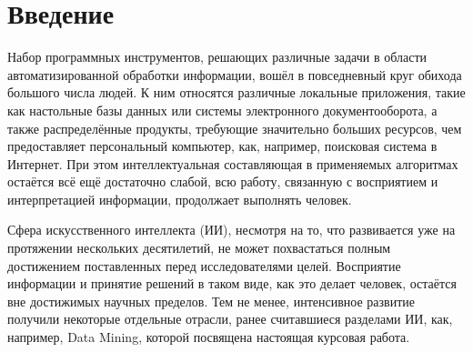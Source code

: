 \section{Введение}

Набор программных инструментов, решающих различные задачи в области
автоматизированной обработки информации, вошёл в повседневный круг
обихода большого числа людей. К ним относятся различные локальные
приложения, такие как настольные базы данных или системы электронного
документооборота, а также распределённые продукты, требующие
значительно больших ресурсов, чем предоставляет персональный
компьютер, как, например, поисковая система в Интернет. При этом
интеллектуальная составляющая в применяемых алгоритмах остаётся всё
ещё достаточно слабой, всю работу, связанную с восприятием и
интерпретацией информации, продолжает выполнять человек.

Сфера искусственного интеллекта (ИИ), несмотря на то, что развивается
уже на протяжении нескольких десятилетий, не может похвастаться полным
достижением поставленных перед исследователями целей. Восприятие
информации и принятие решений в таком виде, как это делает человек,
остаётся вне достижимых научных пределов. Тем не менее, интенсивное
развитие получили некоторые отдельные отрасли, ранее считавшиеся
разделами ИИ, как, например, Data Mining, которой посвящена настоящая
курсовая работа.
